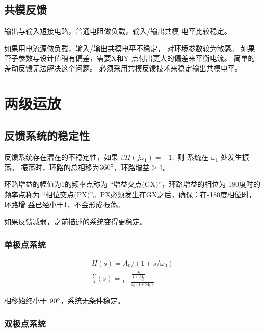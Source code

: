 \documentclass[cn,11pt,chinese,black,simple]{../elegantbook}
\begin{document}


\subsection{共模反馈}

输出与输入短接电路，普通电阻做负载，输入/输出共模
电平比较稳定。



如果用电流源做负载，输入/输出共模电平不稳定，
对环境参数较为敏感。
如果管子参数与设计值稍有偏差，需要X和Y
点付出更大的偏差来平衡电流。
简单的差动反馈无法解决这个问题。
必须采用共模反馈技术来稳定输出共模电平。



\section{两级运放}

\subsection{反馈系统的稳定性}


反馈系统存在潜在的不稳定性，如果 \(\beta H\left(j \omega_{1}\right)=-1,\) 则 系统在 \(\omega_{1}\) 处发生振荡。 振荡时，环路的总相移为\(360^{\circ}\)，环路增益\(\geq 1\)。

环路增益的幅值为1的频率点称为 “增益交点(GX)”，环路增益的相位为-180度时的频率点称为 “相位交点(PX)”。PX必须发生在GX之后，确保：在-180度相位时，环路增
益已经小于1，不会形成振荡。

如果反馈减弱，之前描述的系统变得更稳定。

\subsubsection{单极点系统}
\[
    \begin{array}{l}
        H(s)=A_{0} /\left(1+s / \omega_{0}\right) \\
        \frac{Y}{X}(s)=\frac{\frac{A_{0}}{1+\beta A_{0}}}{1+\frac{s}{\omega_{0}\left(1+\beta A_{0}\right)}}
    \end{array}\]

相移始终小于 \(90^{\circ}\)，系统无条件稳定。

\subsubsection{双极点系统}
\end{document}
